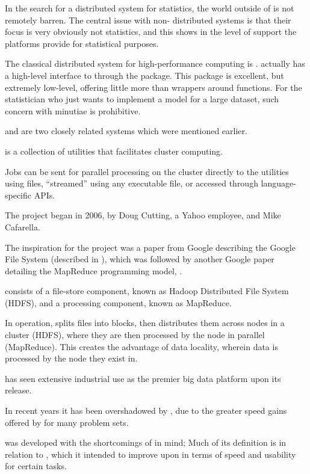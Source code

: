 
In the search for a distributed system for statistics, the world outside
of \R{} is not remotely barren. The central issue with non-\R{} distributed
systems is that their focus is very obviously not statistics, and this
shows in the level of support the platforms provide for statistical
purposes.

The classical distributed system for high-performance computing is .
\R{} actually has a high-level interface to  through the 
package. This package is excellent, but extremely low-level, offering
little more than wrappers around  functions. For the statistician who
just wants to implement a model for a large dataset, such concern with
minutiae is prohibitive.

 and  are two closely related systems which were mentioned
earlier.

 is a collection of utilities that facilitates cluster
computing.

Jobs can be sent for parallel processing on the cluster directly to the
utilities using  files, ``streamed'' using any executable file, or
accessed through language-specific APIs.

The project began in 2006, by Doug Cutting, a Yahoo employee, and Mike
Cafarella.

The inspiration for the project was a paper from Google describing the
Google File System (described in \textcite{ghemawat2003google}), which was
followed by another Google paper detailing the MapReduce programming
model, \textcite{dean2004mapreduce}.

 consists of a file-store component, known as Hadoop Distributed
File System (HDFS), and a processing component, known as MapReduce.

In operation,  splits files into blocks, then distributes them
across nodes in a cluster (HDFS), where they are then processed by the
node in parallel (MapReduce). This creates the advantage of data
locality, wherein data is processed by the node they exist in.

 has seen extensive industrial use as the premier big data
platform upon its release.

In recent years it has been overshadowed by , due to the greater
speed gains offered by  for many problem sets.

 was developed with the shortcomings of  in mind; Much of
its definition is in relation to , which it intended to improve
upon in terms of speed and usability for certain
tasks\cite{zaharia2010spark}.

